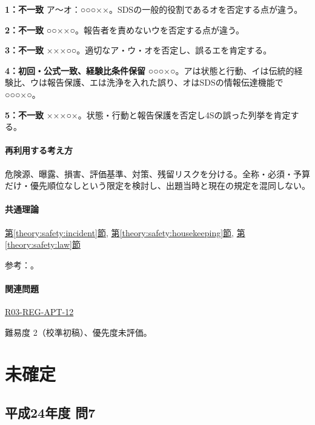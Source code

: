 \noindent\textbf{1：不一致} ア〜オ：○○○××。SDSの一般的役割であるオを否定する点が違う。\par

\noindent\textbf{2：不一致} ○○××○。報告者を責めないウを否定する点が違う。\par

\noindent\textbf{3：不一致} ×××○○。適切なア・ウ・オを否定し、誤るエを肯定する。\par

\noindent\textbf{4：初回・公式一致、経験比条件保留} ○○○×○。アは状態と行動、イは伝統的経験比、ウは報告保護、エは洗浄を入れた誤り、オはSDSの情報伝達機能で○○○×○。\par

\noindent\textbf{5：不一致} ×××○×。状態・行動と報告保護を否定し4Sの誤った列挙を肯定する。\par

\paragraph{再利用する考え方} 危険源、曝露、損害、評価基準、対策、残留リスクを分ける。全称・必須・予算だけ・優先順位なしという限定を検討し、出題当時と現在の規定を混同しない。

\paragraph{共通理論} \hyperref[theory:safety:incident]{第\ref*{theory:safety:incident}節}, \hyperref[theory:safety:housekeeping]{第\ref*{theory:safety:housekeeping}節}, \hyperref[theory:safety:law]{第\ref*{theory:safety:law}節}

\par 参考：\cite{saf_welfare,saf_4s,saf_chemqa}。

\paragraph{関連問題} \hyperref[q:r03-reg-apt-12]{R03-REG-APT-12}

\par 難易度 2（校準初稿）、優先度未評価。

\section{未確定}

\subsection{平成24年度 問7}
\label{q:h24-reg-apt-07}

